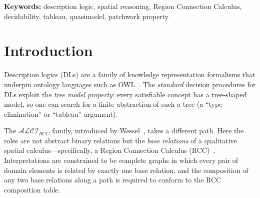 \documentclass[a4paper,11pt]{article}
\theoremstyle{definition}
\newcommand{\ALCI}{\ensuremath{\mathcal{ALCI}}}
\newcommand{\ALCIRCC}[1]{\ensuremath{\mathcal{ALCI}_{\mathit{RCC#1}}}}
\newcommand{\EQ}{\ensuremath{\mathsf{EQ}}}
\newcommand{\EXPTIME}{\textsc{ExpTime}}
\newcommand{\PSPACE}{\textsc{PSpace}}
\begin{document}
\bigskip

\begin{abstract}
The description logics $\ALCIRCC{5}$ and $\ALCIRCC{8}$ extend $\ALCI$
with role boxes derived from the composition tables of the Region
Connection Calculi RCC5 and RCC8.  These logics were introduced by
Wessel~\cite{Wessel2003}, who established \PSPACE-hardness of
$\ALCIRCC{5}$ and \EXPTIME-hardness of $\ALCIRCC{8}$ but left
decidability open.  We present two procedures---a
\emph{type-elimination algorithm} and a \emph{tableau calculus with
blocking}---that exploit the \emph{patchwork property} of the RCC
calculi~\cite{RenzNebel1999} and the full tractability of the RCC5
algebra~\cite{Renz1999}.
\textbf{Erratum (April 2026):} The type-elimination algorithm is
\textbf{unsound}---it rejects satisfiable concepts (see
Remark~\ref{rem:type-elim-bug}).  The root cause is that
condition~(Q3) is anti-monotone in the type set, causing cascade
elimination when starting from all types.
Additionally, the (Q3) soundness proof has a gap for
singleton-multiplicity types ($\EQ \notin \mathsf{DN}$).  The
decidability of $\ALCIRCC{5}$ and $\ALCIRCC{8}$ remains
\textbf{genuinely open}.
\end{abstract}

\medskip
\noindent\textbf{Keywords:} description logic, spatial reasoning,
Region Connection Calculus, decidability, tableau, quasimodel,
patchwork property

\section{Introduction}
\label{sec:intro}

Description logics (DLs) are a family of knowledge representation
formalisms that underpin ontology languages such as
OWL~\cite{BaaderEtAl2003}.  The \emph{standard} decision procedures
for DLs exploit the \emph{tree model property}: every satisfiable
concept has a tree-shaped model, so one can search for a finite
abstraction of such a tree (a ``type elimination'' or ``tableau''
argument).

The $\ALCIRCC{}$ family, introduced by
Wessel~\cite{Wessel2003,Wessel2000}, takes a different path.  Here the
roles are not abstract binary relations but the \emph{base relations}
of a qualitative spatial calculus---specifically, a Region Connection
Calculus (RCC)~\cite{RandellEtAl1992}.  Interpretations are
constrained to be complete graphs in which every pair of domain
elements is related by exactly one base relation, and the composition
of any two base relations along a path is required to conform to the
RCC composition table.
\end{document}

